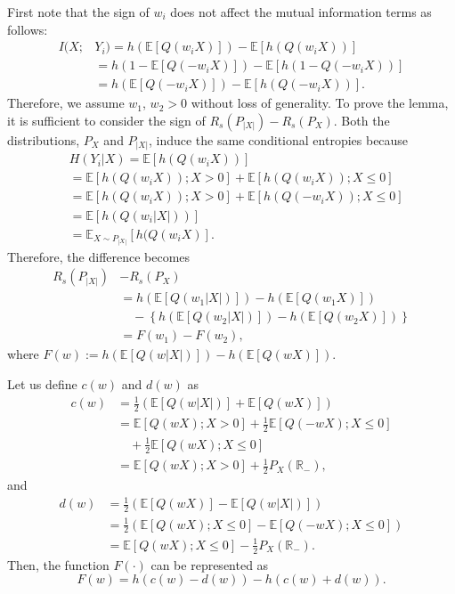 \documentclass[journal]{IEEEtran}
\begin{document}
\begin{IEEEproof}
First note that the sign of $w_i$ does not affect the mutual information terms as follows: 
\begin{align}
    I(X;& Y_i) = h(\mathbb{E}[Q(w_i X)]) - \mathbb{E}[h(Q(w_i X))]
    \\&= h(1-\mathbb{E}[Q(-w_i X)]) - \mathbb{E}[h(1-Q(-w_i X))]
    \\&= h(\mathbb{E}[Q(-w_i X)]) - \mathbb{E}[h(Q(-w_i X))].
\end{align}
Therefore, we assume $w_1$, $w_2 > 0$ without loss of generality.
To prove the lemma, it is sufficient to consider the sign of ${R_s(P_{|X|})-R_s(P_X)}$. 
Both the distributions, $P_X$ and $P_{|X|}$, induce the same conditional entropies because 
\begin{align}
    &H(Y_i|X) = \mathbb{E}[h(Q(w_i X))]
    \\& =  \mathbb{E}[h(Q(w_i X));X>0] + \mathbb{E}[h(Q(w_i X));X \leq 0]
    \\& = \mathbb{E}[h(Q(w_i X));X>0] + \mathbb{E}[h(Q(-w_i X));X \leq 0]
    \\& = \mathbb{E}[h(Q(w_i |X|))]
     \\& = \mathbb{E}_{X\sim P_{|X|}}[h(Q(w_i X)].
\end{align}
Therefore, the difference becomes
\begin{align}
    R_s(P_{|X|}) &- R_s(P_X) \nonumber
    \\& = h(\mathbb{E} [Q(w_1|X|) ]) - h(\mathbb{E}[Q(w_1 X)])
    \\& \quad - \left\{ h(\mathbb{E} [Q(w_2 |X|) ]) - h(\mathbb{E}[Q(w_2 X)])  \right\} \nonumber
    \\& = F(w_1) - F(w_2),
\end{align}
where $F(w) := h(\mathbb{E} [Q(w|X| )]) - h(\mathbb{E}[Q(w X)])$.

Let us define $c(w)$ and $d(w)$ as
\begin{align}
    c(w) &= \frac{1}{2} \left( \mathbb{E} [Q(w|X|)] + \mathbb{E}[Q(wX)] \right)
    \\&= \mathbb{E} [Q(wX);X>0] + \frac{1}{2}  \mathbb{E} [Q(-wX);X \leq 0]
    \\& \quad + \frac{1}{2}\mathbb{E}[Q(wX);X\leq 0] \nonumber
    \\& = \mathbb{E} [Q(wX);X>0] + \frac{1}{2} P_X(\mathbb{R_-}),
\end{align}
and
\begin{align}
    d(w) &= \frac{1}{2} \left( \mathbb{E}[Q(wX)] - \mathbb{E} [Q(w|X| )] \right)
    \\&= \frac{1}{2} \left( \mathbb{E} [Q(wX);X\leq0] - \mathbb{E}[Q(-wX);X\leq 0] \right)
    \\& = \mathbb{E} [Q(wX);X\leq0] - \frac{1}{2} P_X(\mathbb{R_-}).
\end{align}
Then, the function $F(\cdot)$ can be represented as
\begin{equation}
    F(w) = h(c(w)-d(w)) - h(c(w)+d(w)).
\end{equation}


\end{IEEEproof}
\end{document}
